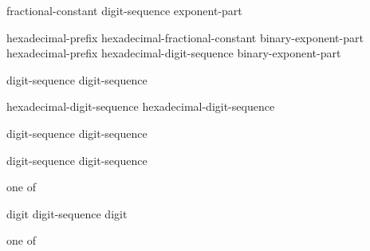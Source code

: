 \begin{bnf}
\br
    fractional-constant  \br
    digit-sequence exponent-part 
\end{bnf}

\begin{bnf}
\br
    hexadecimal-prefix hexadecimal-fractional-constant binary-exponent-part \br
    hexadecimal-prefix hexadecimal-digit-sequence binary-exponent-part 
\end{bnf}

\begin{bnf}
\br
      digit-sequence\br
    digit-sequence 
\end{bnf}

\begin{bnf}
\br
      hexadecimal-digit-sequence\br
    hexadecimal-digit-sequence 
\end{bnf}

\begin{bnf}
\br
      digit-sequence\br
      digit-sequence
\end{bnf}

\begin{bnf}
\br
      digit-sequence\br
      digit-sequence
\end{bnf}

\begin{bnf}
 \textnormal{one of}\br
    \terminal{+  -}
\end{bnf}

\begin{bnf}
\br
    digit\br
    digit-sequence  digit
\end{bnf}

\begin{bnf}
 \textnormal{one of}\br
\end{bnf}

